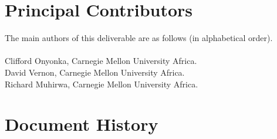 \documentclass{CSSRforAfrica}
\newcommand{\blank}{~\\}
\begin{document}
\newpage




\pagebreak
\section*{Principal Contributors}
\label{contributors}
The main authors of this deliverable are as follows (in alphabetical order).
\blank
~
\blank
Clifford Onyonka, Carnegie Mellon University Africa.\\    %
David Vernon, Carnegie Mellon University Africa.\\    %
Richard Muhirwa, Carnegie Mellon University Africa.\\    %

  

\newpage
\section*{Document History}
\label{document_history}
\end{document}
